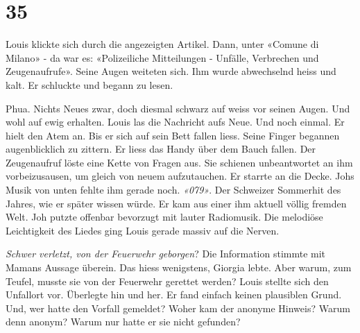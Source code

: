 \chapter{35}



Louis klickte sich durch die angezeigten Artikel. Dann, unter «Comune di
Milano» - da war es: «Polizeiliche Mitteilungen - Unfälle, Verbrechen und
Zeugenaufrufe». Seine Augen weiteten sich. Ihm wurde abwechselnd heiss
und kalt. Er schluckte und begann zu lesen.

\sectionbreak


\sectionbreak

Phua. Nichts Neues zwar, doch diesmal schwarz auf weiss vor seinen
Augen. Und wohl auf ewig erhalten. Louis las die Nachricht aufs Neue.
Und noch einmal. Er hielt den Atem an. Bis er sich auf sein Bett fallen
liess. Seine Finger begannen augenblicklich zu zittern. Er liess das Handy über dem Bauch
fallen.
Der Zeugenaufruf löste eine Kette von Fragen aus. Sie schienen
unbeantwortet an ihm vorbeizusausen, um gleich von neuem aufzutauchen.
Er starrte an die Decke. Johs Musik
von unten fehlte ihm gerade noch. \emph{«079»}. Der
Schweizer Sommerhit des Jahres, wie er später wissen würde. Er kam aus
einer ihm aktuell völlig fremden Welt. Joh putzte offenbar bevorzugt mit
lauter Radiomusik.
Die melodiöse Leichtigkeit des Liedes ging Louis gerade massiv auf die Nerven. 


\emph{Schwer verletzt, von der Feuerwehr geborgen}? Die Information
stimmte mit Mamans Aussage überein. Das hiess wenigstens, Giorgia lebte.
Aber warum, zum Teufel, musste sie von der Feuerwehr gerettet werden?
Louis stellte sich den Unfallort vor. Überlegte hin und her. Er fand
einfach keinen plausiblen Grund.
Und, wer hatte den Vorfall gemeldet? Woher kam der anonyme Hinweis? Warum
denn anonym? Warum nur hatte er sie nicht gefunden?

